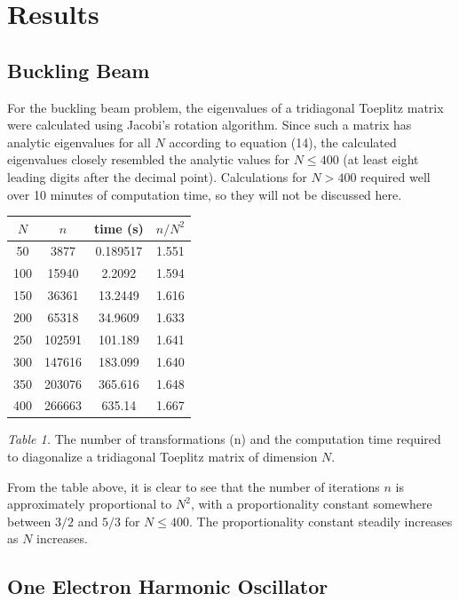 \documentclass[prb,aps,twocolumn,showpacs,10pt]{revtex4-1}
\begin{document}
\section{Results}

\subsection{Buckling Beam}

For the buckling beam problem, the eigenvalues of a tridiagonal Toeplitz matrix were calculated using Jacobi's rotation algorithm. Since such a matrix has analytic eigenvalues for all $N$ according to equation (14), the calculated eigenvalues closely resembled the analytic values for $N\leq 400$ (at least eight leading digits after the decimal point). Calculations for $N>400$ required well over 10 minutes of computation time, so they will not be discussed here. 
\begin{center}
\begin{tabular}{|c|c|c|c|}
\hline
$N$ & $n$ & time (s) & $n/N^2$ \\
\hline
\hline
50 & 3877 & 0.189517  &1.551\\
\hline
100 & 15940 & 2.2092& 1.594\\
\hline
150 & 36361 & 13.2449&1.616\\
\hline
200 & 65318 & 34.9609&1.633\\
\hline
250 & 102591 & 101.189&1.641\\
\hline
300 & 147616 & 183.099&1.640\\
\hline
350 & 203076 & 365.616 & 1.648\\
\hline
400 & 266663 & 635.14& 1.667\\
\hline
\end{tabular}

\vspace*{5mm}
\textit{Table 1.} The number of transformations (n) and the computation time required to diagonalize a tridiagonal Toeplitz matrix of dimension $N$.
\end{center}

From the table above, it is clear to see that the number of iterations $n$ is approximately proportional to $N^2$, with a proportionality constant somewhere between $3/2$ and $5/3$ for $N \leq 400$. The proportionality constant steadily increases as $N$ increases.

\subsection{One Electron Harmonic Oscillator}
\end{document}
